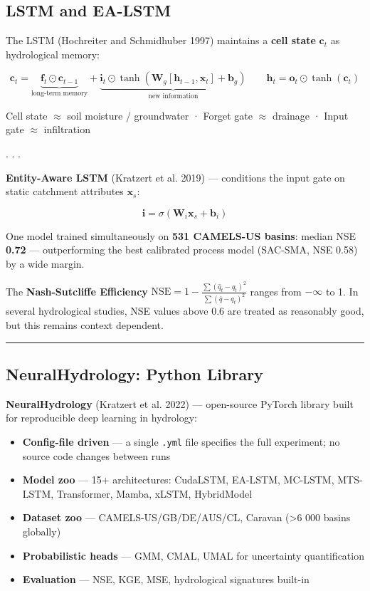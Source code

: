\documentclass[
  letterpaper,
  DIV=11,
  numbers=noendperiod]{scrartcl}
\providecommand{\tightlist}{%
  \setlength{\itemsep}{0pt}\setlength{\parskip}{0pt}}
\begin{document}
\subsection{LSTM and EA-LSTM}\label{lstm-and-ea-lstm}

The LSTM (Hochreiter and Schmidhuber 1997) maintains a \textbf{cell
state} \(\mathbf{c}_t\) as hydrological memory:

\[\mathbf{c}_t = \underbrace{\mathbf{f}_t \odot \mathbf{c}_{t-1}}_{\text{long-term memory}} + \underbrace{\mathbf{i}_t \odot \tanh(\mathbf{W}_g [\mathbf{h}_{t-1}, \mathbf{x}_t] + \mathbf{b}_g)}_{\text{new information}} \qquad \mathbf{h}_t = \mathbf{o}_t \odot \tanh(\mathbf{c}_t)\]

Cell state \(\approx\) soil moisture / groundwater · Forget gate
\(\approx\) drainage · Input gate \(\approx\) infiltration

. . .

\textbf{Entity-Aware LSTM} (Kratzert et al. 2019) --- conditions the
input gate on static catchment attributes \(\mathbf{x}_s\):

\[\mathbf{i} = \sigma(\mathbf{W}_i \mathbf{x}_s + \mathbf{b}_i)\]

One model trained simultaneously on \textbf{531 CAMELS-US basins}:
median NSE \textbf{0.72} --- outperforming the best calibrated process
model (SAC-SMA, NSE 0.58) by a wide margin.

The \textbf{Nash-Sutcliffe Efficiency}
\(\text{NSE} = 1 - \frac{\sum(\hat{q}_t - q_t)^2}{\sum(\bar{q} - q_t)^2}\)
ranges from \(-\infty\) to 1. In several hydrological studies, NSE
values above 0.6 are treated as reasonably good, but this remains
context dependent.

\begin{center}\rule{0.5\linewidth}{0.5pt}\end{center}

\subsection{NeuralHydrology: Python
Library}\label{neuralhydrology-python-library}

\textbf{NeuralHydrology} (Kratzert et al. 2022) --- open-source PyTorch
library built for reproducible deep learning in hydrology:

\begin{itemize}
\tightlist
\item
  \textbf{Config-file driven} --- a single \texttt{.yml} file specifies
  the full experiment; no source code changes between runs
\item
  \textbf{Model zoo} --- 15+ architectures: CudaLSTM, EA-LSTM, MC-LSTM,
  MTS-LSTM, Transformer, Mamba, xLSTM, HybridModel
\item
  \textbf{Dataset zoo} --- CAMELS-US/GB/DE/AUS/CL, Caravan
  (\textgreater6 000 basins globally)
\item
  \textbf{Probabilistic heads} --- GMM, CMAL, UMAL for uncertainty
  quantification
\item
  \textbf{Evaluation} --- NSE, KGE, MSE, hydrological signatures
  built-in
\end{itemize}
\end{document}
